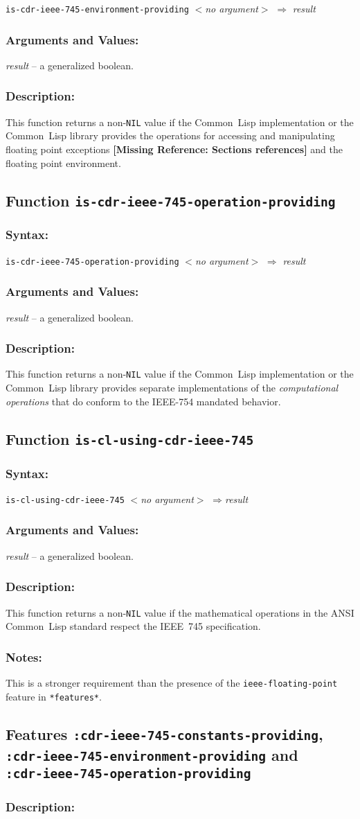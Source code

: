 \documentclass[10pt,fleqn]{article}
\newcommand{\CL}{\textsf{Common~Lisp}}
\newcommand{\checkref}[1]{{\textbf{[Missing Reference: #1]}}}
\newcommand{\code}[1]{\texttt{#1}}
\newcommand{\varname}[1]{\textit{#1}}
\newcommand{\RArrow}{$\Rightarrow$}
\newcommand{\IEEEFPStd}{IEEE-754}
\newcommand{\DDictionaryItem}[1]{\vspace*{6pt}\noindent\hrulefill\vspace*{-9pt}\subsection*{#1}}
\newcommand{\DSyntax}{\subsubsection*{Syntax:}}
\newcommand{\DArgsNValues}{\subsubsection*{Arguments and Values:}}
\newcommand{\DDescription}{\subsubsection*{Description:}}
\newcommand{\DNotes}{\subsubsection*{Notes:}}
\begin{document}
\code{is-cdr-ieee-745-environment-providing} \varname{$<$no argument$>$}
$\Rightarrow$ \varname{result}

\DArgsNValues{}

\varname{result} -- a generalized boolean.

\DDescription{}

This function returns a non-\code{NIL} value if the \CL{}
implementation or the \CL{} library provides the operations for
accessing and manipulating floating point exceptions
\checkref{Sections references} and the floating
point environment.


\DDictionaryItem{Function \code{is-cdr-ieee-745-operation-providing}}

\DSyntax{}

\code{is-cdr-ieee-745-operation-providing} \varname{$<$no argument$>$}
$\Rightarrow$ \varname{result}

\DArgsNValues{}

\varname{result} -- a generalized boolean.


\DDescription{}

This function returns a non-\code{NIL} value if the \CL{}
implementation or the \CL{} library provides separate implementations
of the \emph{computational operations} that do conform to the \IEEEFPStd{}
mandated behavior.


\DDictionaryItem{Function \code{is-cl-using-cdr-ieee-745}}

\DSyntax{}

\code{is-cl-using-cdr-ieee-745} \varname{$<$no argument$>$}
\RArrow \varname{result}

\DArgsNValues{}

\varname{result} -- a generalized boolean.


\DDescription{}

This function returns a non-\code{NIL} value if the mathematical
operations in the ANSI \CL{} standard \cite{1996:ANSIHyperSpec} respect the
IEEE~745 specification.

\DNotes{}

This is a stronger requirement than the
presence of the \code{ieee-floating-point} feature in
\code{*features*}.


\DDictionaryItem{Features \code{:cdr-ieee-745-constants-providing},\\
  \code{:cdr-ieee-745-environment-providing} and\\
  \code{:cdr-ieee-745-operation-providing}}

\DDescription{}
\end{document}

